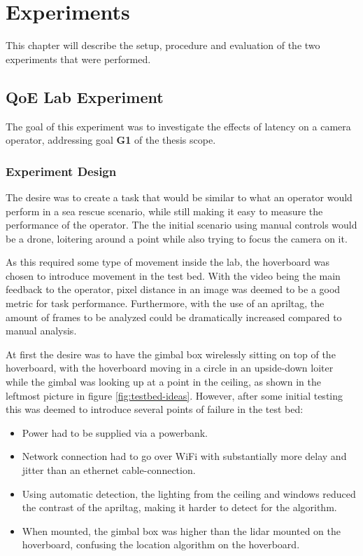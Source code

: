 \documentclass[nofilelist]{cslthse-msc}
\begin{document}
\chapter{Experiments}
This chapter will describe the setup, procedure and evaluation of the two experiments that were performed.

\section{QoE Lab Experiment}
The goal of this experiment was to investigate the effects of latency on a camera operator, addressing goal \textbf{G1} of the thesis scope.

\subsection{Experiment Design}
The desire was to create a task that would be similar to what an operator would perform in a sea rescue scenario, while still making it easy to measure the performance of the operator. The the initial scenario using manual controls would be a drone, loitering around a point while also trying to focus the camera on it. 

As this required some type of movement inside the lab, the hoverboard was chosen to introduce movement in the test bed. With the video being the main feedback to the operator, pixel distance in an image was deemed to be a good metric for task performance. Furthermore, with the use of an apriltag, the amount of frames to be analyzed could be dramatically increased compared to manual analysis.

At first the desire was to have the gimbal box wirelessly sitting on top of the hoverboard, with the hoverboard moving in a circle in an upside-down loiter while the gimbal was looking up at a point in the ceiling, as shown in the leftmost picture in figure \ref{fig:testbed-ideas}. However, after some initial testing this was deemed to introduce several points of failure in the test bed:

\begin{itemize}
   \item Power had to be supplied via a powerbank.
   \item Network connection had to go over WiFi with substantially more delay and jitter than an ethernet cable-connection. 
   \item Using automatic detection, the lighting from the ceiling and windows reduced the contrast of the apriltag, making it harder to detect for the algorithm.
   \item When mounted, the gimbal box was higher than the lidar mounted on the hoverboard, confusing the location algorithm on the hoverboard.
\end{itemize}
\end{document}

